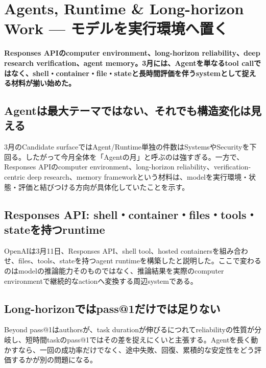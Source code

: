 \section{Agents, Runtime \& Long-horizon Work — モデルを実行環境へ置く}
\label{pkg:agents-runtime-long-horizon-march}
\noindent\textbf{Responses APIのcomputer environment、long-horizon reliability、deep research verification、agent memory。3月には、Agentを単なるtool callではなく、shell・container・file・stateと長時間評価を伴うsystemとして捉える材料が揃い始めた。}\autocite{src-01572b4c34e9,src-0ec537ec1cc1,src-2b8b39e5cae3,src-42318ebdee75}

\subsection{Agentは最大テーマではない、それでも構造変化は見える}

3月のCandidate surfaceではAgent/Runtime単独の件数はSystemsやSecurityを下回る。したがって今月全体を「Agentの月」と呼ぶのは強すぎる。一方で、Responses APIのcomputer environment、long-horizon reliability、verification-centric deep research、memory frameworkという材料は、modelを実行環境・状態・評価と結びつける方向が具体化していたことを示す。\autocite{src-01572b4c34e9,src-0ec537ec1cc1,src-2b8b39e5cae3,src-42318ebdee75}


\subsection{Responses API: shell・container・files・tools・stateを持つruntime}

OpenAIは3月11日、Responses API、shell tool、hosted containersを組み合わせ、files、tools、stateを持つagent runtimeを構築したと説明した。ここで変わるのはmodelの推論能力そのものではなく、推論結果を実際のcomputer environmentで継続的なactionへ変換する周辺systemである。\autocite{src-01572b4c34e9}


\subsection{Long-horizonではpass@1だけでは足りない}

Beyond pass@1はauthorsが、task durationが伸びるにつれてreliabilityの性質が分岐し、短時間taskのpass@1ではその差を捉えにくいと主張する。Agentを長く動かすなら、一回の成功率だけでなく、途中失敗、回復、累積的な安定性をどう評価するかが別の問題になる。\autocite{src-0ec537ec1cc1}


